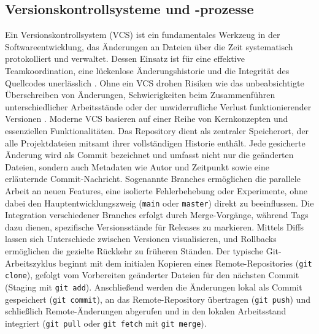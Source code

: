 \documentclass[12pt,oneside]{article}
\begin{document}
    \subsection{Versionskontrollsysteme und -prozesse}
    \label{subsec:versionskontrolle}
    Ein Versionskontrollsystem (VCS) ist ein fundamentales Werkzeug in der Softwareentwicklung, das Änderungen an Dateien über die Zeit systematisch protokolliert und verwaltet. Dessen Einsatz ist für eine effektive Teamkoordination, eine lückenlose Änderungshistorie und die Integrität des Quellcodes unerlässlich \cite{ChaconStraubProGit}. Ohne ein VCS drohen Risiken wie das unbeabsichtigte Überschreiben von Änderungen, Schwierigkeiten beim Zusammenführen unterschiedlicher Arbeitsstände oder der unwiderrufliche Verlust funktionierender Versionen \cite{moldstud2024}.
    \newline
    Moderne VCS basieren auf einer Reihe von Kernkonzepten und essenziellen Funktionalitäten. Das Repository dient als zentraler Speicherort, der alle Projektdateien mitsamt ihrer vollständigen Historie enthält. Jede gesicherte Änderung wird als Commit bezeichnet und umfasst nicht nur die geänderten Dateien, sondern auch Metadaten wie Autor und Zeitpunkt sowie eine erläuternde Commit-Nachricht. Sogenannte Branches ermöglichen die parallele Arbeit an neuen Features, eine isolierte Fehlerbehebung oder Experimente, ohne dabei den Hauptentwicklungszweig (\texttt{main} oder \texttt{master}) direkt zu beeinflussen. Die Integration verschiedener Branches erfolgt durch Merge-Vorgänge, während Tags dazu dienen, spezifische Versionsstände für Releases zu markieren. Mittels Diffs lassen sich Unterschiede zwischen Versionen visualisieren, und Rollbacks ermöglichen die gezielte Rückkehr zu früheren Ständen.
    \newline
    Der typische Git-Arbeitszyklus beginnt mit dem initialen Kopieren eines Remote-Repositories (\texttt{git clone}), gefolgt vom Vorbereiten geänderter Dateien für den nächsten Commit (Staging mit \texttt{git add}). Anschließend werden die Änderungen lokal als Commit gespeichert (\texttt{git commit}), an das Remote-Repository übertragen (\texttt{git push}) und schließlich Remote-Änderungen abgerufen und in den lokalen Arbeitsstand integriert (\texttt{git pull} oder \texttt{git fetch} mit \texttt{git merge}).
\end{document}
